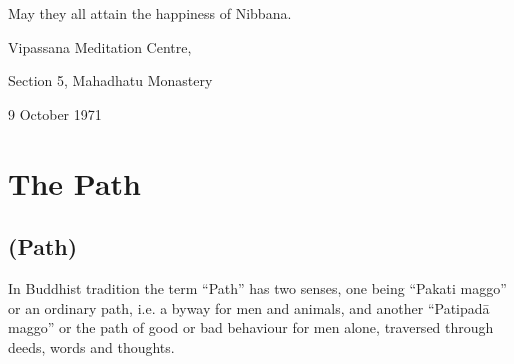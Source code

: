 \documentclass[a5paper,10pt,english]{book}
\begin{document}
\sphinxAtStartPar
May they all attain the happiness of Nibbana.

\begin{DUlineblock}{0em}
\item[] 
\item[] Vipassana Meditation Centre,
\item[] Section 5, Mahadhatu Monastery
\item[] 9 October 1971
\end{DUlineblock}

\egroup
\mainmatter
\iffalse
   \let\subsubsection\subsection
   \let\subsection\section
   \let\section\chapter
   \let\chapter\part
\fi

\sphinxstepscope


\chapter{The Path}
\label{\detokenize{path:the-path}}\label{\detokenize{path::doc}}

\section{(Path)}
\label{\detokenize{path:path}}
\sphinxAtStartPar
In Buddhist tradition the term “Path” has two senses, one being “Pakati maggo” or an ordinary path, i.e. a byway for men and animals, and another “Patipadā maggo” or the path of good or bad behaviour for men alone, traversed through deeds, words and thoughts.
\end{document}
